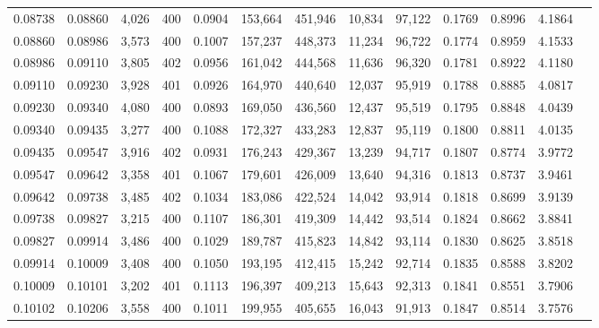 \begin{tabular}{rrrrrrrrrrrrr}
0.08738 & 0.08860 &  4,026 & 400 &                                     0.0904 & 153,664 & 451,946 &  10,834 &  97,122 & 0.1769 & 0.8996 & 4.1864 \\
0.08860 & 0.08986 &  3,573 & 400 &                                     0.1007 & 157,237 & 448,373 &  11,234 &  96,722 & 0.1774 & 0.8959 & 4.1533 \\
0.08986 & 0.09110 &  3,805 & 402 &                                     0.0956 & 161,042 & 444,568 &  11,636 &  96,320 & 0.1781 & 0.8922 & 4.1180 \\
0.09110 & 0.09230 &  3,928 & 401 &                                     0.0926 & 164,970 & 440,640 &  12,037 &  95,919 & 0.1788 & 0.8885 & 4.0817 \\
0.09230 & 0.09340 &  4,080 & 400 &                                     0.0893 & 169,050 & 436,560 &  12,437 &  95,519 & 0.1795 & 0.8848 & 4.0439 \\
0.09340 & 0.09435 &  3,277 & 400 &                                     0.1088 & 172,327 & 433,283 &  12,837 &  95,119 & 0.1800 & 0.8811 & 4.0135 \\
0.09435 & 0.09547 &  3,916 & 402 &                                     0.0931 & 176,243 & 429,367 &  13,239 &  94,717 & 0.1807 & 0.8774 & 3.9772 \\
0.09547 & 0.09642 &  3,358 & 401 &                                     0.1067 & 179,601 & 426,009 &  13,640 &  94,316 & 0.1813 & 0.8737 & 3.9461 \\
0.09642 & 0.09738 &  3,485 & 402 &                                     0.1034 & 183,086 & 422,524 &  14,042 &  93,914 & 0.1818 & 0.8699 & 3.9139 \\
0.09738 & 0.09827 &  3,215 & 400 &                                     0.1107 & 186,301 & 419,309 &  14,442 &  93,514 & 0.1824 & 0.8662 & 3.8841 \\
0.09827 & 0.09914 &  3,486 & 400 &                                     0.1029 & 189,787 & 415,823 &  14,842 &  93,114 & 0.1830 & 0.8625 & 3.8518 \\
0.09914 & 0.10009 &  3,408 & 400 &                                     0.1050 & 193,195 & 412,415 &  15,242 &  92,714 & 0.1835 & 0.8588 & 3.8202 \\
0.10009 & 0.10101 &  3,202 & 401 &                                     0.1113 & 196,397 & 409,213 &  15,643 &  92,313 & 0.1841 & 0.8551 & 3.7906 \\
0.10102 & 0.10206 &  3,558 & 400 &                                     0.1011 & 199,955 & 405,655 &  16,043 &  91,913 & 0.1847 & 0.8514 & 3.7576 \\

\end{tabular}
